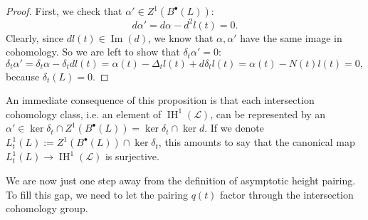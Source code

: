 \documentclass[a4paper,12 pt,titlepage,twoside]{book}
\DeclareMathOperator{\Ima}{Im}
\DeclareMathOperator{\IH}{IH}
\theoremstyle{plain}
\theoremstyle{theorem}
\theoremstyle{definition}
\theoremstyle{remark}
\begin{document}
	\begin{proof}
		First, we check that $\alpha' \in Z^1(B^\bullet(L)):$ $$d\alpha' = d\alpha - d^2l(t) =0.$$
		Clearly, since $dl(t) \in \Ima(d)$, we know that $\alpha,\alpha'$ have the same image in cohomology. So we are left to show that $\delta_t \alpha' = 0:$ $$\delta_t \alpha' = \delta_t \alpha - \delta_t d l(t) = \alpha(t) - \Delta_t l(t) + d \delta_tl(t) = \alpha(t) - N(t)l(t) = 0,$$ because $\delta_t(L) =0$. 
	\end{proof}
	An immediate consequence of this proposition is that each intersection cohomology class, i.e. an element of $\IH^1(\mathcal{L})$, can be represented by an $\alpha' \in \ker \delta_t \cap Z^1(B^\bullet(L))= \ker \delta_t \cap \ker d.$ If we denote $L_t^1(L) := Z^1(B^\bullet(L)) \cap \ker \delta_t$, this amounts to say that the canonical map $L_t^1(L) \rightarrow \IH^1(\mathcal{L})$ is surjective. \newline
	
	We are now just one step away from the definition of asymptotic height pairing. To fill this gap, we need to let the pairing $q(t)$ factor through the intersection cohomology group.
	
\end{document}
